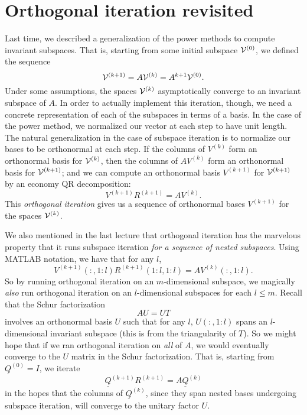\documentclass[12pt, leqno]{article} %
\newcommand{\uQ}{\underline{Q}}
\begin{document}

\section{Orthogonal iteration revisited}

Last time, we described a generalization of the power methods to
compute invariant subspaces.  That is, starting from some initial
subspace $\mathcal{V}^{(0)}$, we defined the sequence
\[
  \mathcal{V}^{(k+1)} = A \mathcal{V}^{(k)} = A^{k+1} \mathcal{V}^{(0)}.
\]
Under some assumptions, the spaces $\mathcal{V}^{(k)}$ asymptotically converge
to an invariant subspace of $A$.
In order to actually implement this iteration, though, we need
a concrete representation of each of the subspaces in terms of a basis.
In the case of the power method, we normalized our vector at each step
to have unit length.  The natural generalization in the case of
subspace iteration is to normalize our bases to be orthonormal at each
step.  If the columns of $V^{(k)}$ form an orthonormal basis for
$\mathcal{V}^{(k)}$, then the columns of $AV^{(k)}$ form an orthonormal
basis for $\mathcal{V}^{(k+1)}$; and we can compute an orthonormal basis
$V^{(k+1)}$ for $\mathcal{V}^{(k+1)}$ by an economy QR decomposition:
\[
  V^{(k+1)} R^{(k+1)} = A V^{(k)}.
\]
This {\em orthogonal iteration} gives us a sequence of orthonormal
bases $V^{(k+1)}$ for the spaces $\mathcal{V}^{(k)}$.

We also mentioned in the last lecture that orthogonal iteration has
the marvelous property that it runs subspace iteration
{\em for a sequence of nested subspaces}.  Using MATLAB notation,
we have that for any $l$,
\[
  V^{(k+1)}(:,1:l) R^{(k+1)}(1:l,1:l) = A V^{(k)}(:,1:l).
\]
So by running orthogonal iteration on an $m$-dimensional subspace,
we magically {\em also} run orthogonal iteration on an $l$-dimensional
subspaces for each $l \leq m$.  Recall that the Schur factorization
\[
  AU = UT
\]
involves an orthonormal basis $U$ such that for any $l$,
$U(:,1:l)$ spans an $l$-dimensional invariant subspace
(this is from the triangularity of $T$).  So we might hope that
if we ran orthogonal iteration on {\em all} of $A$, we would
eventually converge to the $U$ matrix in the Schur factorization.
That is, starting from $\uQ^{(0)} = I$, we iterate
\begin{equation} \label{orth-iter-def}
  \uQ^{(k+1)} R^{(k+1)} = A \uQ^{(k)}
\end{equation}
in the hopes that the columns of $\uQ^{(k)}$, since they span
nested bases undergoing subspace iteration, will converge
to the unitary factor $U$.
\end{document}
